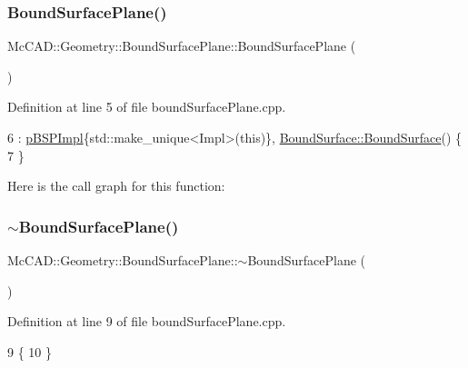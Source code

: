 \subsubsection{\texorpdfstring{Bound\+Surface\+Plane()}{BoundSurfacePlane()}\hspace{0.1cm}{\footnotesize\ttfamily [1/2]}}
{\footnotesize\ttfamily Mc\+C\+A\+D\+::\+Geometry\+::\+Bound\+Surface\+Plane\+::\+Bound\+Surface\+Plane (\begin{DoxyParamCaption}{ }\end{DoxyParamCaption})}



Definition at line 5 of file bound\+Surface\+Plane.\+cpp.


\begin{DoxyCode}
6   : \hyperlink{classMcCAD_1_1Geometry_1_1BoundSurfacePlane_a4e6fab5cba3cc226ad29f679bd3886ce}{pBSPImpl}\{std::make\_unique<Impl>(\textcolor{keyword}{this})\}, \hyperlink{classMcCAD_1_1Geometry_1_1BoundSurface_a50af5d5cd7cc2a92400422f57988d137}{BoundSurface::BoundSurface}() 
      \{
7 \}
\end{DoxyCode}
Here is the call graph for this function\+:
\mbox{\label{classMcCAD_1_1Geometry_1_1BoundSurfacePlane_aaa23bc872b8601fb818fe6ddb457beac}} 
\subsubsection{\texorpdfstring{$\sim$\+Bound\+Surface\+Plane()}{~BoundSurfacePlane()}\hspace{0.1cm}{\footnotesize\ttfamily [1/2]}}
{\footnotesize\ttfamily Mc\+C\+A\+D\+::\+Geometry\+::\+Bound\+Surface\+Plane\+::$\sim$\+Bound\+Surface\+Plane (\begin{DoxyParamCaption}{ }\end{DoxyParamCaption})}



Definition at line 9 of file bound\+Surface\+Plane.\+cpp.


\begin{DoxyCode}
9                                                   \{
10 \}
\end{DoxyCode}
\mbox{\label{classMcCAD_1_1Geometry_1_1BoundSurfacePlane_aae9af5a7f31d48a6293c236525831587}} 
